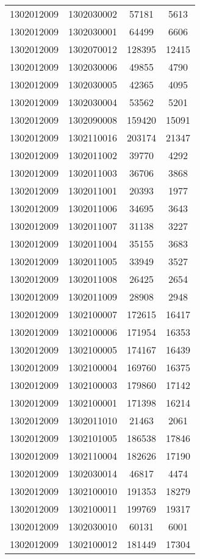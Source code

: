 \begin{longtable}[h]{llcc}
		1302012009 & 1302030002 & 57181 & 5613\\
		1302012009 & 1302030001 & 64499 & 6606\\
		1302012009 & 1302070012 & 128395 & 12415\\
		1302012009 & 1302030006 & 49855 & 4790\\
		1302012009 & 1302030005 & 42365 & 4095\\
		1302012009 & 1302030004 & 53562 & 5201\\
		1302012009 & 1302090008 & 159420 & 15091\\
		1302012009 & 1302110016 & 203174 & 21347\\
		1302012009 & 1302011002 & 39770 & 4292\\
		1302012009 & 1302011003 & 36706 & 3868\\
		1302012009 & 1302011001 & 20393 & 1977\\
		1302012009 & 1302011006 & 34695 & 3643\\
		1302012009 & 1302011007 & 31138 & 3227\\
		1302012009 & 1302011004 & 35155 & 3683\\
		1302012009 & 1302011005 & 33949 & 3527\\
		1302012009 & 1302011008 & 26425 & 2654\\
		1302012009 & 1302011009 & 28908 & 2948\\
		1302012009 & 1302100007 & 172615 & 16417\\
		1302012009 & 1302100006 & 171954 & 16353\\
		1302012009 & 1302100005 & 174167 & 16439\\
		1302012009 & 1302100004 & 169760 & 16375\\
		1302012009 & 1302100003 & 179860 & 17142\\
		1302012009 & 1302100001 & 171398 & 16214\\
		1302012009 & 1302011010 & 21463 & 2061\\
		1302012009 & 1302101005 & 186538 & 17846\\
		1302012009 & 1302110004 & 182626 & 17190\\
		1302012009 & 1302030014 & 46817 & 4474\\
		1302012009 & 1302100010 & 191353 & 18279\\
		1302012009 & 1302100011 & 199769 & 19317\\
		1302012009 & 1302030010 & 60131 & 6001\\
		1302012009 & 1302100012 & 181449 & 17304\\

\end{longtable}
